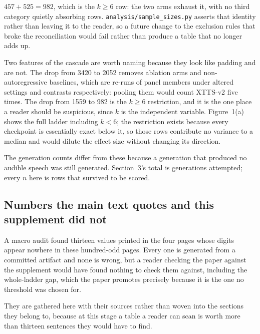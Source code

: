 \documentclass[11pt]{article}
\begin{document}
\noindent $457 + 525 = 982$, which is the $k\ge6$ row: the two arms exhaust it,
with no third category quietly absorbing rows. \texttt{analysis/sample\_sizes.py}
asserts that identity rather than leaving it to the reader, so a future change to
the exclusion rules that broke the reconciliation would fail rather than produce
a table that no longer adds up.

Two features of the cascade are worth naming because they look like padding and
are not. The drop from 3420 to 2052 removes ablation arms and non-autoregressive
baselines, which are re-runs of panel members under altered settings and
contrasts respectively: pooling them would count XTTS-v2 five times. The drop
from 1559 to 982 is the $k\ge6$ restriction, and it is the one place a reader
should be suspicious, since $k$ is the independent variable. Figure~1(a) shows
the full ladder including $k<6$; the restriction exists because every checkpoint
is essentially exact below it, so those rows contribute no variance to a median
and would dilute the effect size without changing its direction.

The generation counts differ from these because a generation that produced no
audible speech was still generated. Section~3's total is generations attempted;
every $n$ here is rows that survived to be scored.


\subsection{Numbers the main text quotes and this supplement did not}

A macro audit found thirteen values printed in the four pages whose digits appear
nowhere in these hundred-odd pages. Every one is generated from a committed
artifact and none is wrong, but a reader checking the paper against the
supplement would have found nothing to check them against, including the
whole-ladder gap, which the paper promotes
precisely because it is the one no threshold was chosen for.

They are gathered here with their sources rather than woven into the sections
they belong to, because at this stage a table a reader can scan is worth more
than thirteen sentences they would have to find.
\end{document}
